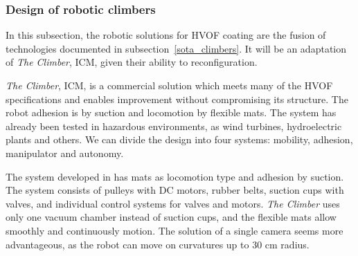 \subsubsection{Design of robotic climbers}\label{proj_climbers}
In this subsection, the robotic solutions for HVOF coating are the fusion
of technologies documented in subsection~\ref{sota_climbers}. It will be an
adaptation of \emph{The Climber}, ICM, given their ability to reconfiguration.


\emph{The Climber}, ICM, is a commercial solution which meets many
of the HVOF specifications and enables improvement without compromising its
structure. The robot adhesion is by suction and locomotion by flexible mats.
The system has already been tested in hazardous environments, as wind turbines,
hydroelectric plants and others. We can divide the design into four systems:
mobility, adhesion, manipulator and autonomy.


The system developed in \cite{kim2008development} has mats as locomotion type
and adhesion by suction. The system consists of pulleys with DC motors, rubber
belts, suction cups with valves,  and individual control systems for valves and
motors. \emph{The Climber} uses only one vacuum chamber instead of suction cups,
and the flexible mats allow smoothly and continuously motion.
The solution of a single camera seems more advantageous, as the robot can
move on curvatures up to 30 cm radius.


